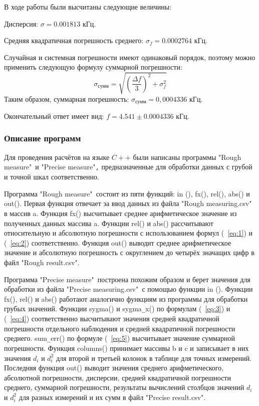 В ходе работы были высчитаны следующие величины:

Дисперсия: $\sigma=0.001813$ кГц.

Средняя квадратичная погрешность среднего: $\sigma_f=0.0002764$ кГц.

Случайная и системная погрешности имеют одинаковый порядок, поэтому можно применить следующую формулу суммарной погрешности:
\begin{equation}
\label{eq:5}
\sigma_{сумм}=\sqrt{(\frac{\Delta f}{3})^2+\sigma_f^2}
\end{equation}
Таким образом, суммарная погрешность: $\sigma_{сумм}=0,0004336$ кГц.

Окончательный ответ имеет вид: $f=4.541\pm0.0004336$ кГц.

\subsubsection{Описание программ}
Для проведения расчётов на языке $C++$ были написаны программы "Rough measure"\verb| |и "Precise measure"\verb|,| предназначенные для обработки данных с грубой и точной шкал соответственно.

Программа "Rough measure"\verb| |состоит из пяти функций: in (), fx(), rel(), abs() и out(). Первая функция отвечает за ввод данных из файла "Rough measuring.csv"\verb| |в массив a. Функция fx() высчитывает среднее арифметическое значение из полученных данных массива a. Функции rel() и abs() рассчитывают относительную и абсолютную погрешности с использованием формул (~\ref{eq:1}) и (~\ref{eq:2}) соответственно. Функция out() выводит среднее арифметическое значение и абсолютную погрешность с округлением до четырёх значащих цифр в файл "Rough result.csv".

Программа "Precise measure"\verb| |построена похожим образом и берет значения для обработки из файла "Precise measuring.csv"\verb| |с помощью функции in (). Функции fx(), rel() и abs() работают аналогично функциям из программы для обработки грубых значений. Функции sygma() и sygma\verb|_|x() по формулам (~\ref{eq:3}) и (~\ref{eq:4}) соответственно высчитывают значения средней квадратичной погрешности отдельного наблюдения и средней квадратичной погрешности среднего. sum\verb|_|err() по формуле (~\ref{eq:5}) высчитывает значение суммарной погрешности. Функция columns() принимает массивы b и c и записывает в них значения $d_i$ и $d_i^2$ для второй и третьей колонок в таблице для точных измерений. Последняя функция out() выводит значения среднего арифметического, абсолютной погрешности, дисперсии, средней квадратичной погрешности среднего, суммарной погрешности, результаты вычислений столбцов значений $d_i$ и $d_i^2$ для разных измерений и их сумм в файл "Precise result.csv".


